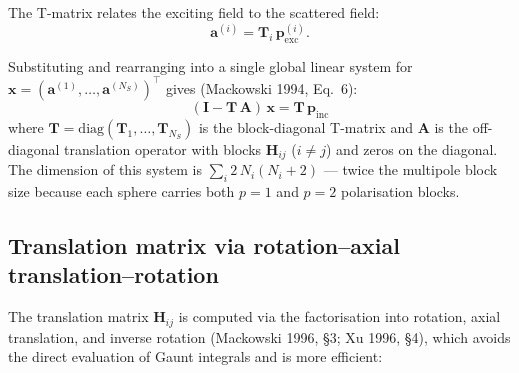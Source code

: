 \documentclass[11pt,a4paper]{article}
\begin{document}
The T-matrix relates the exciting field to the scattered field:
\begin{equation}
  \bm{a}^{(i)} = \mathbf{T}_i\,\bm{p}_\mathrm{exc}^{(i)}.
  \label{eq:tmatrix-relation}
\end{equation}

Substituting and rearranging into a single global linear system for $\bm{x} = (\bm{a}^{(1)}, \dots, \bm{a}^{(N_S)})^\top$ gives (Mackowski 1994, Eq.~6):
\begin{equation}
  (\mathbf{I} - \mathbf{T}\,\mathbf{A})\,\bm{x} = \mathbf{T}\,\bm{p}_\mathrm{inc}
  \label{eq:global-system}
\end{equation}
where $\mathbf{T} = \mathrm{diag}(\mathbf{T}_1, \dots, \mathbf{T}_{N_S})$ is the block-diagonal T-matrix and $\mathbf{A}$ is the off-diagonal translation operator with blocks $\mathbf{H}_{ij}$ ($i \neq j$) and zeros on the diagonal.
The dimension of this system is $\sum_i 2\,N_i(N_i+2)$ --- twice the multipole block size because each sphere carries both $p = 1$ and $p = 2$ polarisation blocks.

\subsection{Translation matrix via rotation--axial translation--rotation}

The translation matrix $\mathbf{H}_{ij}$ is computed via the factorisation into rotation, axial translation, and inverse rotation (Mackowski 1996, \S 3; Xu 1996, \S 4), which avoids the direct evaluation of Gaunt integrals and is more efficient:
\end{document}
